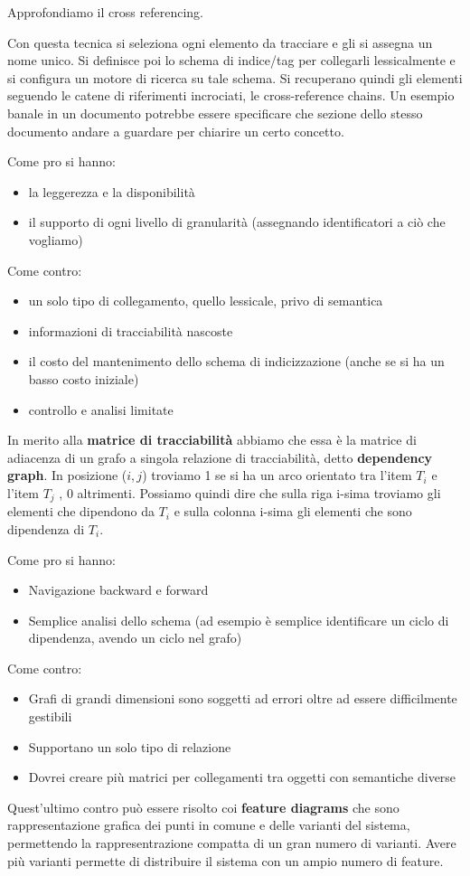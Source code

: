 Approfondiamo il cross referencing.

Con questa tecnica si seleziona ogni elemento da tracciare e gli si assegna un nome unico. Si definisce poi lo schema di indice/tag per collegarli lessicalmente e si configura un motore di ricerca su tale schema. Si recuperano quindi gli elementi seguendo le catene di riferimenti incrociati, le cross-reference chains. Un esempio banale in un documento potrebbe essere specificare che sezione dello stesso documento andare a guardare per chiarire un certo concetto. 

Come pro si hanno:
\begin{itemize}
    \item la leggerezza e la disponibilità
    \item il supporto di ogni livello di granularità (assegnando identificatori a ciò che vogliamo)
\end{itemize}
Come contro:
\begin{itemize}
    \item un solo tipo di collegamento, quello lessicale, privo di semantica
    \item informazioni di tracciabilità nascoste
    \item il costo del mantenimento dello schema di indicizzazione (anche se si ha un basso costo iniziale)
    \item controllo e analisi limitate
\end{itemize}
In merito alla \textbf{matrice di tracciabilità} abbiamo che essa è la matrice di adiacenza di un grafo a singola relazione di tracciabilità, detto \textbf{dependency graph}. In posizione ($i,j$) troviamo 1 se si ha un arco orientato tra l'item $T_i$ e l'item $T_j$ , 0 altrimenti. Possiamo quindi dire che sulla riga i-sima troviamo gli elementi che dipendono da $T_i$ e sulla colonna i-sima gli elementi che sono dipendenza di $T_i$.

Come pro si hanno:
\begin{itemize}
    \item Navigazione backward e forward
    \item Semplice analisi dello schema (ad esempio è semplice identificare un ciclo di dipendenza, avendo un ciclo nel grafo)
\end{itemize}
Come contro:
\begin{itemize}
    \item Grafi di grandi dimensioni sono soggetti ad errori oltre ad essere difficilmente gestibili
    \item Supportano un solo tipo di relazione
    \item Dovrei creare più matrici per collegamenti tra oggetti con semantiche diverse
\end{itemize}
Quest'ultimo contro può essere risolto coi \textbf{feature diagrams} che sono rappresentazione grafica dei punti in comune e delle varianti del sistema, permettendo la rappresentrazione compatta di un gran numero di varianti. Avere più varianti permette di distribuire il sistema con un ampio numero di feature.

